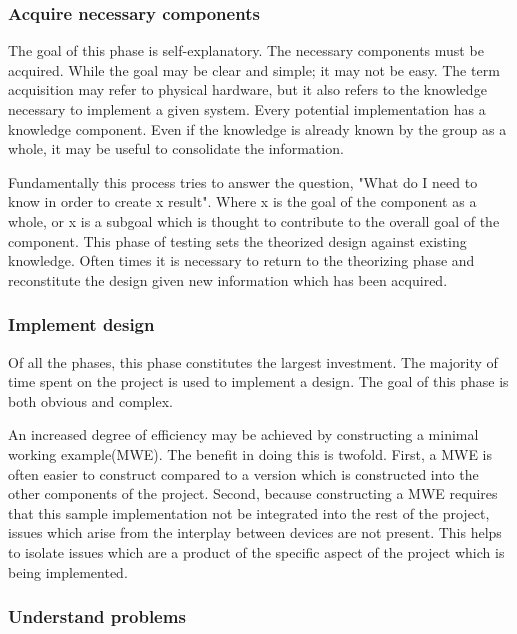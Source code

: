 \documentclass{article}	%
\begin{document}
\begin{multicols}{2}
\subsubsection{Acquire necessary components}
The goal of this phase is self-explanatory.
The necessary components must be acquired.
While the goal may be clear and simple;
it may not be easy.
The term acquisition may refer to  physical hardware,
but it also refers to the knowledge necessary to implement
a given system.
Every potential implementation has a knowledge component.
Even if the knowledge is already known by the group as a whole,
it may be useful to consolidate the information.

Fundamentally this process tries to answer the question,
"What do I need to know in order to create x result".
Where x is the goal of the component as a whole, or
x is a subgoal which is thought to contribute to 
the overall goal of the component.
This phase of testing
sets the theorized design against existing knowledge.
Often times it is necessary to return to the 
theorizing phase and reconstitute the design
given new information which has been acquired.


\subsubsection{Implement design}
Of all the phases, 
this phase constitutes the largest investment.
The majority of time spent on the project is
used to implement a design.
The goal of this phase is both obvious
and complex.

An increased degree of efficiency may be achieved by
constructing a minimal working example(MWE).
The benefit in doing this is twofold.
First, a MWE is often easier to construct compared to
a version which is constructed into the other
components of the project.
Second, because constructing a MWE requires that
this sample implementation not be integrated into
the rest of the project,
issues which arise from the interplay between devices are not present.
This helps to isolate issues which are a product
of the specific aspect of the project which is being implemented.


\subsubsection{Understand problems}


\end{multicols}
\end{document}
